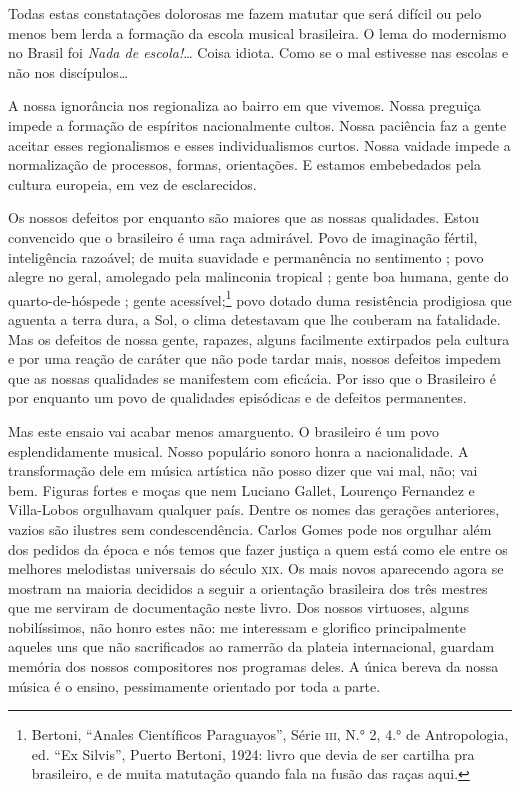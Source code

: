 Todas estas constatações dolorosas me fazem matutar que será difícil ou
pelo menos bem lerda a formação da escola musical brasileira. O lema do
modernismo no Brasil foi \textit{Nada de escola!}\ldots{} Coisa idiota. Como se
o mal estivesse nas escolas e não nos discípulos\ldots{}

A nossa ignorância nos regionaliza ao bairro em que vivemos. Nossa
preguiça impede a formação de espíritos nacionalmente cultos. Nossa
paciência faz a gente aceitar esses regionalismos e esses
individualismos curtos. Nossa vaidade impede a normalização de
processos, formas, orientações. E estamos embebedados pela cultura
europeia, em vez de esclarecidos.

Os nossos defeitos por enquanto são maiores que as nossas qualidades.
Estou convencido que o brasileiro é uma raça admirável. Povo de
imaginação fértil, inteligência razoável; de muita suavidade e
permanência no sentimento ; povo alegre no geral, amolegado pela
malinconia tropical ; gente boa humana, gente do quarto-de-hóspede ;
gente acessível;\footnote{Bertoni, ``Anales Científicos Paraguayos'', Série \textsc{iii},
N.° 2, 4.° de Antropologia, ed. ``Ex Silvis'', Puerto Bertoni, 1924: livro
que devia de ser cartilha pra brasileiro, e de muita matutação quando
fala na fusão das raças aqui.} povo dotado duma resistência prodigiosa
que aguenta a terra dura, a Sol, o clima detestavam que lhe couberam na
fatalidade. Mas os defeitos de nossa gente, rapazes, alguns facilmente
extirpados pela cultura e por uma reação de caráter que não pode tardar
mais, nossos defeitos impedem que as nossas qualidades se manifestem com
eficácia. Por isso que o Brasileiro é por enquanto um povo de qualidades
episódicas e de defeitos permanentes.

Mas este ensaio vai acabar menos amarguento. O brasileiro é um povo
esplendidamente musical. Nosso populário sonoro honra a nacionalidade. A
transformação dele em música artística não posso dizer que vai mal, não;
vai bem. Figuras fortes e moças que nem Luciano Gallet, Lourenço
Fernandez e Villa-Lobos orgulhavam qualquer país. Dentre os nomes das
gerações anteriores, vazios são ilustres sem condescendência. Carlos
Gomes pode nos orgulhar além dos pedidos da época e nós temos que fazer
justiça a quem está como ele entre os melhores melodistas universais do
século \textsc{xix}. Os mais novos aparecendo agora se mostram na maioria decididos
a seguir a orientação brasileira dos três mestres que me serviram de
documentação neste livro. Dos nossos virtuoses, alguns nobilíssimos, não
honro estes não: me interessam e glorifico principalmente aqueles uns
que não sacrificados ao ramerrão da plateia internacional, guardam
memória dos nossos compositores nos programas deles. A única bereva da
nossa música é o ensino, pessimamente orientado por toda a parte.

